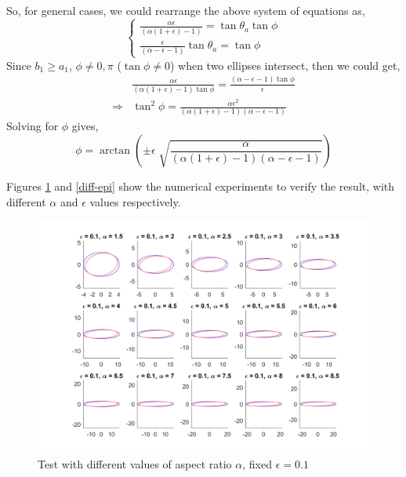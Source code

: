 \documentclass{article}
\begin{document}
So, for general cases, we could rearrange the above system of equations as,
\begin{equation}
\left\{
\begin{aligned}
\frac{\alpha \epsilon}{(\alpha(1+\epsilon)-1)} = \tan\theta_a \tan\phi \\
\frac{\epsilon}{(\alpha - \epsilon - 1)} \tan\theta_a = \tan\phi
\end{aligned}
\right.
\end{equation}
Since $b_1 \geq a_1$, $\phi \neq 0, \pi$ ($\tan\phi \neq 0$) when two ellipses intersect, then we could get,
\begin{equation}
\begin{aligned}
& \frac{\alpha \epsilon}{(\alpha(1+\epsilon)-1) \tan\phi} = \frac{(\alpha - \epsilon - 1) \tan\phi}{\epsilon}\\
\Rightarrow & \tan^2\phi = \frac{\alpha \epsilon^2}{(\alpha(1+\epsilon)-1)(\alpha - \epsilon - 1)}
\end{aligned}
\end{equation}
Solving for $\phi$ gives,
\begin{equation}
\phi = \arctan (\pm \epsilon \sqrt[]{\frac{\alpha}{(\alpha(1+\epsilon)-1)(\alpha - \epsilon - 1)}})
\end{equation}

Figures \ref{diff-alpha} and \ref{diff-epi} show the numerical experiments to verify the result, with different $\alpha$ and $\epsilon$ values respectively.

\begin{figure}
\centering
\includegraphics[scale = 0.4]{fig/closed-form_maxAngle-test_alpha.png}
\caption{Test with different values of aspect ratio $\alpha$, fixed $\epsilon = 0.1$}
\label{diff-alpha}
\end{figure}
	
\end{document}
